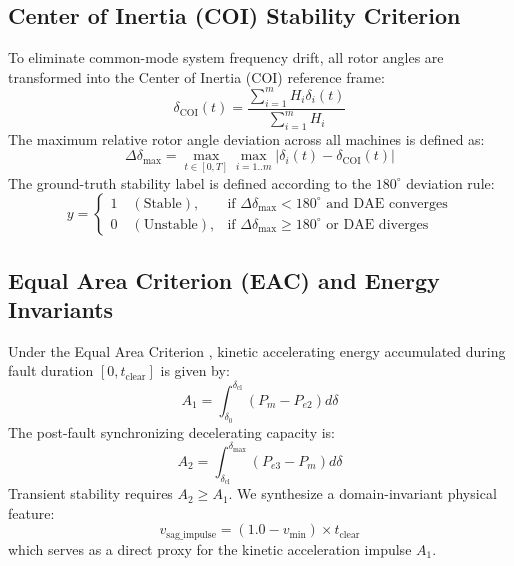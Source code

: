 \documentclass[journal]{IEEEtran}
\begin{document}
\subsection{Center of Inertia (COI) Stability Criterion}
To eliminate common-mode system frequency drift, all rotor angles are transformed into the Center of Inertia (COI) reference frame:
\begin{equation}
\delta_{\text{COI}}(t) = \frac{\sum_{i=1}^{m} H_i \delta_i(t)}{\sum_{i=1}^{m} H_i}
\end{equation}
The maximum relative rotor angle deviation across all machines is defined as:
\begin{equation}
\Delta\delta_{\max} = \max_{t \in [0, T]} \max_{i=1..m} |\delta_i(t) - \delta_{\text{COI}}(t)|
\end{equation}
The ground-truth stability label is defined according to the $180^\circ$ deviation rule:
\begin{equation}
y = \begin{cases} 
1 \quad (\text{Stable}), & \text{if } \Delta\delta_{\max} < 180^\circ \text{ and DAE converges} \\
0 \quad (\text{Unstable}), & \text{if } \Delta\delta_{\max} \ge 180^\circ \text{ or DAE diverges}
\end{cases}
\end{equation}

\subsection{Equal Area Criterion (EAC) and Energy Invariants}
Under the Equal Area Criterion \cite{athay1979practical}, kinetic accelerating energy accumulated during fault duration $[0, t_{\text{clear}}]$ is given by:
\begin{equation}
A_1 = \int_{\delta_0}^{\delta_{\text{cl}}} (P_m - P_{e2}) d\delta
\end{equation}
The post-fault synchronizing decelerating capacity is:
\begin{equation}
A_2 = \int_{\delta_{\text{cl}}}^{\delta_{\max}} (P_{e3} - P_m) d\delta
\end{equation}
Transient stability requires $A_2 \ge A_1$. We synthesize a domain-invariant physical feature:
\begin{equation}
v_{\text{sag\_impulse}} = (1.0 - v_{\min}) \times t_{\text{clear}}
\end{equation}
which serves as a direct proxy for the kinetic acceleration impulse $A_1$.
\end{document}
